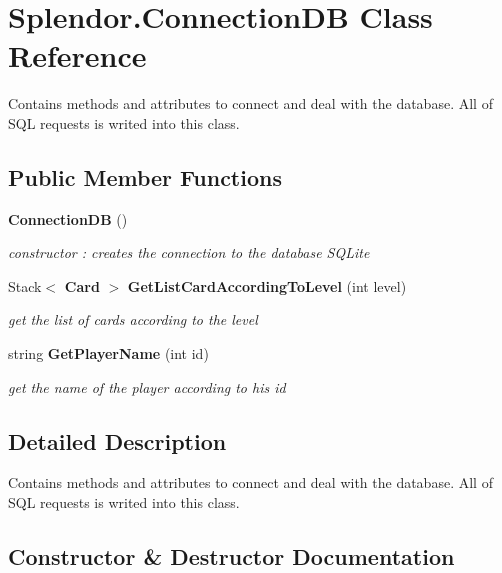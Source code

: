 \section{Splendor.\+Connection\+DB Class Reference}
\label{class_splendor_1_1_connection_d_b}


Contains methods and attributes to connect and deal with the database. All of S\+QL requests is writed into this class.  


\subsection*{Public Member Functions}
\begin{DoxyCompactItemize}
\item 
\textbf{ Connection\+DB} ()
\begin{DoxyCompactList}\small\item\em constructor \+: creates the connection to the database S\+Q\+Lite \end{DoxyCompactList}\item 
Stack$<$ \textbf{ Card} $>$ \textbf{ Get\+List\+Card\+According\+To\+Level} (int level)
\begin{DoxyCompactList}\small\item\em get the list of cards according to the level \end{DoxyCompactList}\item 
string \textbf{ Get\+Player\+Name} (int id)
\begin{DoxyCompactList}\small\item\em get the name of the player according to his id \end{DoxyCompactList}\end{DoxyCompactItemize}


\subsection{Detailed Description}
Contains methods and attributes to connect and deal with the database. All of S\+QL requests is writed into this class. 



\subsection{Constructor \& Destructor Documentation}
\mbox{\label{class_splendor_1_1_connection_d_b_aaaa5c66d4f12702d36a76dd21beb62c4}} 
